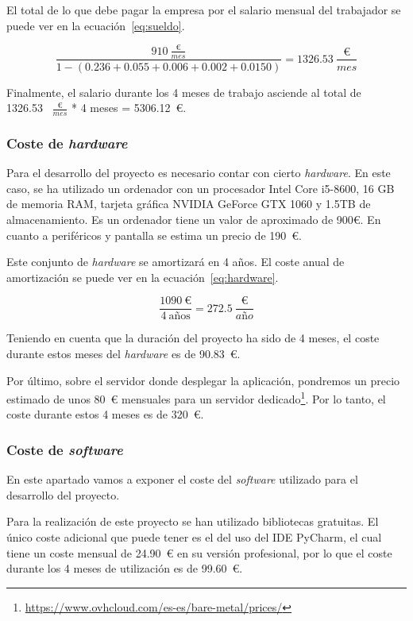El total de lo que debe pagar la empresa por el salario mensual del trabajador se puede ver en la ecuación~\ref{eq:sueldo}.

\begin{equation}\label{eq:sueldo}
\frac{910~\frac{\text{€}}{mes}}{1 - (0.236 + 0.055 + 0.006 + 0.002 + 0.0150)} = 1326.53~ \frac{\text{€}}{mes}
\end{equation}

Finalmente, el salario durante los 4 meses de trabajo asciende al total de 1326.53~ $\frac{\text{€}}{mes}$ * 4 meses = 5306.12~€.


\subsubsection{Coste de \textit{hardware}}
Para el desarrollo del proyecto es necesario contar con cierto \textit{hardware}.
En este caso, se ha utilizado un ordenador con un procesador Intel Core i5-8600, 16 GB de memoria RAM, tarjeta gráfica NVIDIA GeForce GTX 1060 y 1.5TB de almacenamiento.
Es un ordenador tiene un valor de aproximado de 900€. En cuanto a periféricos y pantalla se estima un precio de 190~€.

Este conjunto de \textit{hardware} se amortizará en 4 años. El coste anual de amortización se puede ver en la ecuación~\ref{eq:hardware}.

\begin{equation}\label{eq:hardware}
\frac{1090~\text{€}}{4~\text{años}} = 272.5~\frac{\text{€}}{año}
\end{equation}

Teniendo en cuenta que la duración del proyecto ha sido de 4 meses, el coste durante estos meses del \textit{hardware} es de 90.83~€.

Por último, sobre el servidor donde desplegar la aplicación, pondremos un precio estimado de unos 80~€ mensuales para un servidor dedicado\footnote{\url{https://www.ovhcloud.com/es-es/bare-metal/prices/}}. Por lo tanto, el coste durante estos 4 meses es de 320~€.

\subsubsection{Coste de \textit{software}}
En este apartado vamos a exponer el coste del \textit{software} utilizado para el desarrollo del proyecto.

Para la realización de este proyecto se han utilizado bibliotecas gratuitas. 
El único coste adicional que puede tener es el del uso del IDE PyCharm, el cual tiene un coste mensual de 24.90~€ en su versión profesional, por lo que el coste durante los 4 meses de utilización es de 99.60~€.

